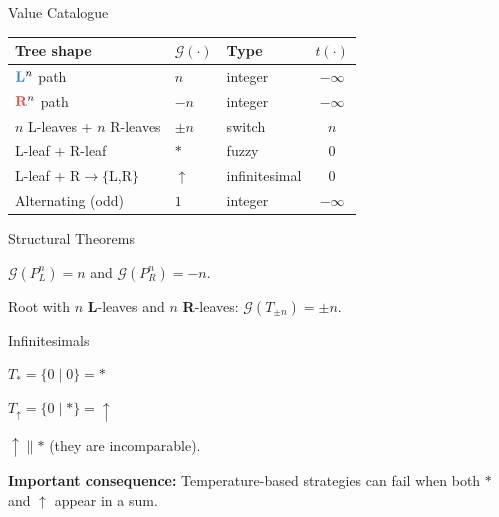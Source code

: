 \documentclass[10pt]{beamer}
\newcommand{\Lopt}[1]{{\color{lblue}\textbf{#1}}}
\newcommand{\Ropt}[1]{{\color{rred}\textbf{#1}}}
\newcommand{\Gv}[1]{\mathcal{G}(#1)}
\newcommand{\tmp}[1]{t\!\left(#1\right)}
\begin{document}
\begin{frame}{Value Catalogue}
  \small
  \begin{tabular}{@{}p{2.9cm}llc@{}}
    \toprule
    Tree shape & $\Gv{\cdot}$ & Type & $\tmp{\cdot}$ \\
    \midrule
    $\Lopt{L}^n$ path          & $n$          & integer       & $-\infty$ \\
    $\Ropt{R}^n$ path          & $-n$         & integer       & $-\infty$ \\
    $n$ L-leaves + $n$ R-leaves & $\pm n$     & switch        & $n$ \\
    L-leaf + R-leaf            & $*$          & fuzzy         & $0$ \\
    L-leaf + R$\to\{$L,R$\}$   & $\uparrow$   & infinitesimal & $0$ \\
    Alternating (odd)          & $1$          & integer       & $-\infty$ \\
    \bottomrule
  \end{tabular}
\end{frame}

\begin{frame}{Structural Theorems}
  \begin{theorem}
    $\Gv{P^n_L} = n$ and $\Gv{P^n_R} = -n$.
  \end{theorem}

  \begin{theorem}
    Root with $n$ \Lopt{L}-leaves and $n$ \Ropt{R}-leaves: $\Gv{T_{\pm n}} = \pm n$.
  \end{theorem}
\end{frame}

\begin{frame}{Infinitesimals}
  \begin{definition}
    $T_* = \{0 \mid 0\} = *$
    
    $T_\uparrow = \{0 \mid *\} = \uparrow$
  \end{definition}

  \begin{theorem}
    $\uparrow \parallel *$ (they are incomparable).
  \end{theorem}

  \textbf{Important consequence:} Temperature-based strategies can fail when both $*$ and $\uparrow$ appear in a sum.
\end{frame}
\end{document}
